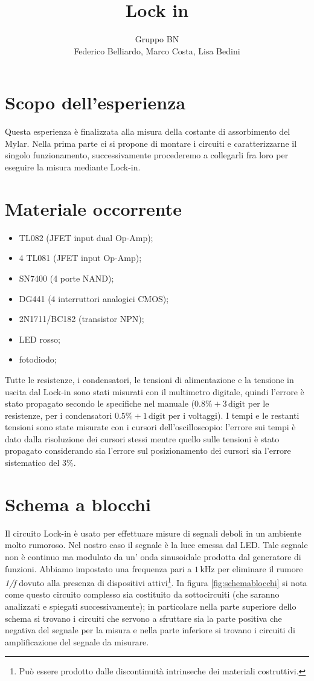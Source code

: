 \documentclass[10pt,a4paper]{article}
\author{Gruppo BN \\ Federico Belliardo, Marco Costa, Lisa Bedini}
\title{Lock in}
\begin{document}
\maketitle
\section{Scopo dell'esperienza}
Questa esperienza è finalizzata alla misura della costante di assorbimento del Mylar. Nella prima parte ci si propone di montare i circuiti e caratterizzarne il singolo funzionamento, successivamente procederemo a collegarli fra loro per eseguire la misura mediante Lock-in.

\section{Materiale occorrente}
\begin{itemize}
\item TL082 (JFET input dual Op-Amp);
\item 4 TL081 (JFET input Op-Amp);
\item SN7400 (4 porte NAND);
\item DG441 (4 interruttori analogici CMOS);
\item 2N1711/BC182 (transistor NPN);
\item LED rosso;
\item fotodiodo;
\end{itemize}

Tutte le resistenze, i condensatori, le tensioni di alimentazione e la tensione in uscita dal Lock-in sono stati misurati con il multimetro digitale, quindi l'errore è stato propagato secondo le specifiche nel manuale ($0.8\% + 3\,\mbox{digit}$ per le resistenze,  per i condensatori $0.5\% + 1\,\mbox{digit}$ per i voltaggi). I tempi e le restanti tensioni sono state misurate con i cursori dell'oscilloscopio: l'errore sui tempi è dato dalla risoluzione dei cursori stessi mentre quello sulle tensioni è stato propagato considerando sia l'errore sul posizionamento dei cursori sia l'errore sistematico del $3\%$.

\section{Schema a blocchi}
Il circuito Lock-in è usato per effettuare misure di segnali deboli in un ambiente molto rumoroso. Nel nostro caso il segnale è la luce emessa dal LED. Tale segnale non è continuo ma modulato da un' onda sinusoidale prodotta dal generatore di funzioni. Abbiamo impostato una frequenza pari a $1\,\mbox{kHz}$ per eliminare il rumore \emph{1/f} dovuto alla presenza di dispositivi attivi\footnote{Può essere prodotto dalle discontinuità intrinseche dei materiali costruttivi.}. In figura \ref{fig:schemablocchi} si nota come questo circuito complesso sia costituito da sottocircuiti (che saranno analizzati e spiegati successivamente); in particolare nella parte superiore dello schema si trovano i circuiti che servono a sfruttare sia la parte positiva che negativa del segnale per la misura e nella parte inferiore si trovano i circuiti di amplificazione del segnale da misurare.
\end{document}
